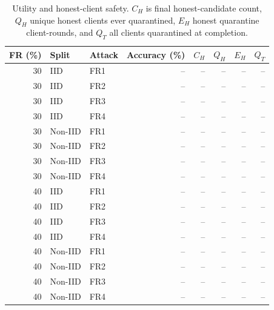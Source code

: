 \begin{table}[t]
\centering\footnotesize\setlength{\tabcolsep}{4pt}
\caption{Utility and honest-client safety. $C_H$ is final honest-candidate count, $Q_H$ unique honest clients ever quarantined, $E_H$ honest quarantine client-rounds, and $Q_T$ all clients quarantined at completion.}\label{tab:safety}
\begin{tabular}{rllrrrrr}
\toprule
FR (\%) & Split & Attack & Accuracy (\%) & $C_H$ & $Q_H$ & $E_H$ & $Q_T$ \\
\midrule
30 & IID & FR1 & -- & -- & -- & -- & -- \\
30 & IID & FR2 & -- & -- & -- & -- & -- \\
30 & IID & FR3 & -- & -- & -- & -- & -- \\
30 & IID & FR4 & -- & -- & -- & -- & -- \\
30 & Non-IID & FR1 & -- & -- & -- & -- & -- \\
30 & Non-IID & FR2 & -- & -- & -- & -- & -- \\
30 & Non-IID & FR3 & -- & -- & -- & -- & -- \\
30 & Non-IID & FR4 & -- & -- & -- & -- & -- \\
40 & IID & FR1 & -- & -- & -- & -- & -- \\
40 & IID & FR2 & -- & -- & -- & -- & -- \\
40 & IID & FR3 & -- & -- & -- & -- & -- \\
40 & IID & FR4 & -- & -- & -- & -- & -- \\
40 & Non-IID & FR1 & -- & -- & -- & -- & -- \\
40 & Non-IID & FR2 & -- & -- & -- & -- & -- \\
40 & Non-IID & FR3 & -- & -- & -- & -- & -- \\
40 & Non-IID & FR4 & -- & -- & -- & -- & -- \\
\bottomrule
\end{tabular}
\end{table}

